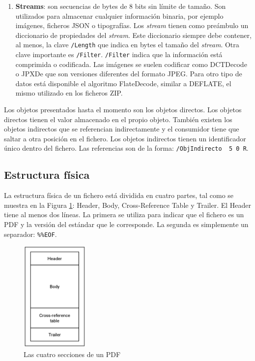 \begin{enumerate}
    \item \textbf{Streams}: son secuencias de bytes de 8 bits sin límite de tamaño. Son utilizados para almacenar cualquier información binaria, por ejemplo imágenes, ficheros JSON o tipografías. Los \emph{stream} tienen como preámbulo un diccionario de propiedades del \emph{stream}. Este diccionario siempre debe contener, al menos, la clave \verb|/Length| que indica en bytes el tamaño del \emph{stream}. Otra clave importante es \verb|/Filter|. \verb|/Filter| indica que la información está comprimida o codificada. Las imágenes se suelen codificar como DCTDecode o JPXDe que son versiones diferentes del formato JPEG. Para otro tipo de datos está disponible el algoritmo FlateDecode, similar a DEFLATE, el mismo utilizado en los ficheros ZIP.
\end{enumerate}

Los objetos presentados hasta el momento son los objetos directos. Los objetos directos tienen el valor almacenado en el propio objeto. También existen los objetos indirectos que se referencian indirectamente y el consumidor tiene que saltar a otra posición en el fichero. Los objetos indirectos tienen un identificador único dentro del fichero. Las referencias son de la forma: \verb|/ObjIndirecto  5 0 R|.

\subsection{Estructura física}

La estructura física de un fichero está dividida en cuatro partes, tal como se muestra en la Figura \ref{fig:secciones-pdf}: Header, Body, Cross-Reference Table y Trailer. El Header tiene al menos dos líneas. La primera se utiliza para indicar que el fichero es un PDF y la versión del estándar que le corresponde. La segunda es simplemente un separador: \verb|%%EOF|. 

\begin{figure}[hp!]
    \centering
    \includegraphics[width=0.3\textwidth]{imaxes/c-bases-teoricas/secciones-de-un-pdf.png}
    \caption{Las cuatro secciones de un PDF}
    \label{fig:secciones-pdf}
\end{figure}

